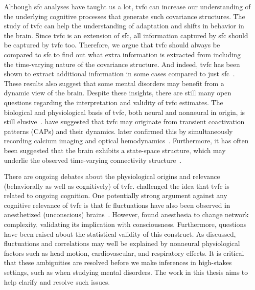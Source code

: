 Although \gls{sfc} analyses have taught us a lot, \gls{tvfc} can increase our understanding of the underlying cognitive processes that generate such covariance structures.
The study of \gls{tvfc} can help the understanding of adaptation and shifts in behavior in the brain.
%
Since \gls{tvfc} is an extension of \gls{sfc}, all information captured by \gls{sfc} should be captured by \gls{tvfc} too.
Therefore, we argue that \gls{tvfc} should always be compared to \gls{sfc} to find out what extra information is extracted from including the time-varying nature of the covariance structure.
And indeed, \gls{tvfc} has been shown to extract additional information in some cases compared to just \gls{sfc}~\parencite[see e.g.][]{Rashid2016, Jin2017, Liegeois2019, Vidaurre2021}.
These results also suggest that some mental disorders may benefit from a dynamic view of the brain.
%
Despite these insights, there are still many open questions regarding the interpretation and validity of \gls{tvfc} estimates.
The biological and physiological basis of \gls{tvfc}, both neural and nonneural in origin, is still elusive~\parencite{Lurie2020}.
\textcite{Liu2013, Petridou2013} have suggested that \gls{tvfc} may originate from transient coactivation patterns (CAPs) and their dynamics.
\textcite{Matsui2019} later confirmed this by simultaneously recording calcium imaging and optical hemodynamics~\parencite[see][for a review of multi-modal approaches]{Thompson2018b}.
Furthermore, it has often been suggested that the brain exhibits a state-space structure, which may underlie the observed time-varying connectivity structure~\parencite{Hutchison2013}.

There are ongoing debates about the physiological origins and relevance (behaviorally as well as cognitively) of \gls{tvfc}.
\textcite{Laumann2017} challenged the idea that \gls{tvfc} is related to ongoing cognition.
One potentially strong argument against any cognitive relevance of \gls{tvfc} is that \gls{fc} fluctuations have also been observed in anesthetized (unconscious) brains~\parencite{Hutchison2013b}.
However, \textcite{Demertzi2019} found anesthesia to change network complexity, validating its implication with consciousness.
Furthermore, questions have been raised about the statistical validity of this construct.
As \textcite{Lurie2020} discussed, fluctuations and correlations may well be explained by nonneural physiological factors such as head motion, cardiovascular, and respiratory effects.
%
It is critical that these ambiguities are resolved before we make inferences in high-stakes settings, such as when studying mental disorders.
The work in this thesis aims to help clarify and resolve such issues.
